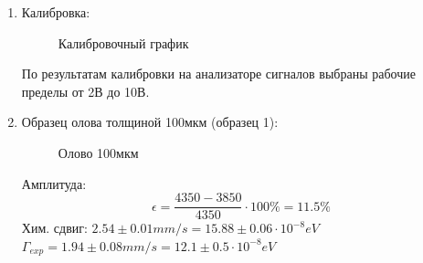 \documentclass[12pt,a4paper]{article}
\begin{document}
\begin{enumerate}

\item Калибровка:
\begin{figure}[ht!]
\caption{Калибровочный график}
\end{figure}

По результатам калибровки на анализаторе сигналов выбраны рабочие пределы от 2В до 10В.

\newpage

\item Образец олова толщиной 100мкм (образец 1):

\begin{figure}[ht!]
\caption{Олово 100мкм}
\end{figure}

Амплитуда: 
\begin{equation*}
\epsilon = \frac{4350 - 3850}{4350} \cdot 100\% = 11.5 \%
\end{equation*}
Хим. сдвиг: $2.54 \pm 0.01 mm/s = 15.88 \pm 0.06 \cdot 10^{-8} eV$ \\
$\Gamma_{exp} = 1.94 \pm 0.08 mm/s = 12.1 \pm 0.5 \cdot 10^{-8} eV$ \\



\end{enumerate}
\end{document}
